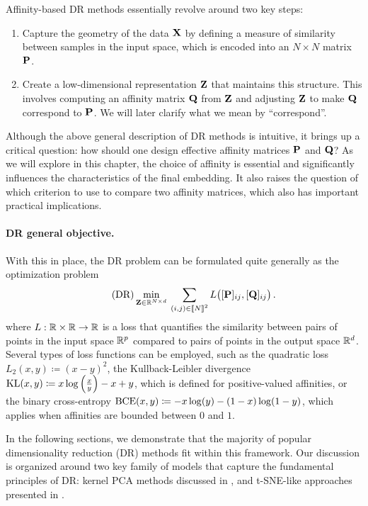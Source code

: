 Affinity-based DR methods essentially revolve around two key steps:

\begin{enumerate}
    \item Capture the geometry of the data ${\mathbf{X}}$ by defining a measure of similarity between samples in the input space, which is encoded into an $N \times N$ matrix ${\mathbf{P}}$.
    \item Create a low-dimensional representation ${\mathbf{Z}}$ that maintains this structure. This involves computing an affinity matrix ${\mathbf{Q}}$ from ${\mathbf{Z}}$ and adjusting ${\mathbf{Z}}$ to make ${\mathbf{Q}}$ correspond to ${\mathbf{P}}$. We will later clarify what we mean by ``correspond''.
\end{enumerate}

Although the above general description of DR methods is intuitive, it brings up a critical question: how should one design effective affinity matrices ${\mathbf{P}}$ and ${\mathbf{Q}}$? As we will explore in this chapter, the choice of affinity is essential and significantly influences the characteristics of the final embedding. It also raises the question of which criterion to use to compare two affinity matrices, which also has important practical implications.


\paragraph{DR general objective.} With this in place, the DR problem can be formulated quite generally as the optimization problem
\begin{equation}
\label{eq:DR_criterion}\tag{DR}
\min_{{\mathbf{Z}} \in \mathbb{R}^{N \times d}} \: \sum_{(i,j) \in {[\![N]\!]}^2}  L\big([{\mathbf{P}}]_{ij}, [{\mathbf{Q}}]_{ij}\big) \,.
\end{equation}
where $L:\mathbb{R} \times \mathbb{R} \rightarrow \mathbb{R}$ is a loss that quantifies the similarity between pairs of points in the input space $\mathbb{R}^{p}$ compared to pairs of points in the output space $\mathbb{R}^{d}$. Several types of loss functions can be employed, such as the quadratic loss $L_2(x, y) \coloneqq (x - y)^2$, the Kullback-Leibler divergence $\operatorname{KL}(x, y) \coloneqq x \log \left(\frac{x}{y}\right) - x + y$, which is defined for positive-valued affinities, or the binary cross-entropy $\operatorname{BCE}(x, y) \coloneqq -x \log(y) - (1 - x) \log(1 - y)$, which applies when affinities are bounded between $0$ and $1$.

In the following sections, we demonstrate that the majority of popular dimensionality reduction (DR) methods fit within this framework. Our discussion is organized around two key family of models that capture the fundamental principles of DR: kernel PCA methods discussed in , and t-SNE-like approaches presented in .



